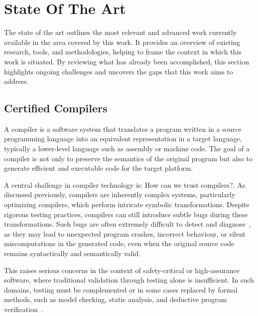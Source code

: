
%

\chapter{State Of The Art}
\label{cha:State_Of_The_Art}

The state of the art outlines the most relevant and advanced work currently available in the area covered by this work. 
It provides an overview of existing research, tools, and methodologies, helping to frame the context in which this work is situated. 
By reviewing what has already been accomplished, this section highlights ongoing challenges and uncovers the gaps that this work 
aims to address.

\section{Certified Compilers}
\label{sec:Certified_Compilers}

A compiler is a software system that translates a program written in a source programming language into an equivalent representation 
in a target language, typically a lower-level language such as assembly or machine code. The goal of a compiler is not only to preserve 
the semantics of the original program but also to generate efficient and executable code for the target platform.~\cite{AhoSU86}

A central challenge in compiler technology is: How can we trust compilers?. As discussed previously, compilers are 
inherently complex systems, particularly optimizing compilers, which perform intricate symbolic transformations. 
Despite rigorous testing practices, compilers can still introduce subtle bugs during these transformations. Such bugs are often 
extremely difficult to detect and diagnose~\cite{Leroy09-back-end}, as they may lead to unexpected program crashes, 
incorrect behaviour, or silent miscomputations in the generated code, even when the original source code remains syntactically and 
semantically valid.

This raises serious concerns in the context of safety-critical or high-assurance software, where traditional validation 
through testing alone is insufficient. In such domains, testing must be complemented or in some cases replaced by formal methods, 
such as model checking, static analysis, and deductive program verification~\cite{Leroy09-back-end}.

